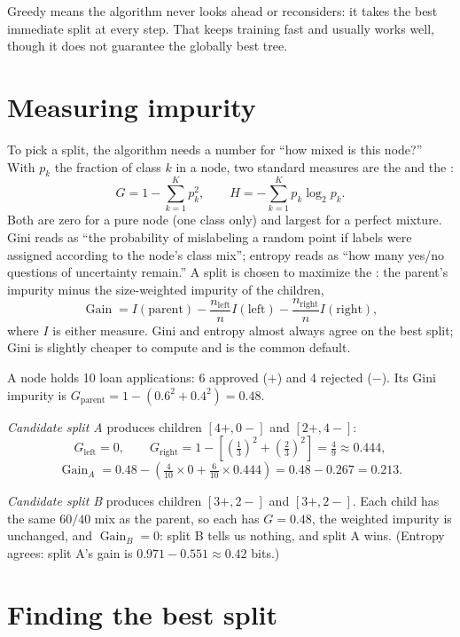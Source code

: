 Greedy means the algorithm never looks ahead or reconsiders: it takes the best immediate split at every step. That keeps training fast and usually works well, though it does not guarantee the globally best tree.

\section{Measuring impurity}

To pick a split, the algorithm needs a number for ``how mixed is this node?'' With $p_k$ the fraction of class $k$ in a node, two standard measures are the  and the :
\[
  G=1-\sum_{k=1}^{K}p_k^2,
  \qquad
  H=-\sum_{k=1}^{K}p_k\log_2 p_k.
\]
Both are zero for a pure node (one class only) and largest for a perfect mixture. Gini reads as ``the probability of mislabeling a random point if labels were assigned according to the node's class mix''; entropy reads as ``how many yes/no questions of uncertainty remain.'' A split is chosen to maximize the : the parent's impurity minus the size-weighted impurity of the children,
\[
  \operatorname{Gain}
  =I(\text{parent})
  -\frac{n_{\mathrm{left}}}{n}I(\text{left})
  -\frac{n_{\mathrm{right}}}{n}I(\text{right}),
\]
where $I$ is either measure. Gini and entropy almost always agree on the best split; Gini is slightly cheaper to compute and is the common default.

\begin{workedexample}
A node holds 10 loan applications: 6 approved ($+$) and 4 rejected ($-$). Its Gini impurity is
$G_{\text{parent}}=1-(0.6^2+0.4^2)=0.48$.

\emph{Candidate split A} produces children $[4+,0-]$ and $[2+,4-]$:
\[
  G_{\text{left}}=0,
  \qquad
  G_{\text{right}}=1-\left[{\left(\tfrac{1}{3}\right)}^2+{\left(\tfrac{2}{3}\right)}^2\right]=\tfrac{4}{9}\approx 0.444,
\]
\[
  \operatorname{Gain}_A
  =0.48-\left(\tfrac{4}{10}\times 0+\tfrac{6}{10}\times 0.444\right)
  =0.48-0.267=0.213.
\]

\emph{Candidate split B} produces children $[3+,2-]$ and $[3+,2-]$. Each child has the same $60/40$ mix as the parent, so each has $G=0.48$, the weighted impurity is unchanged, and $\operatorname{Gain}_B=0$: split B tells us nothing, and split A wins. (Entropy agrees: split A's gain is $0.971-0.551\approx 0.42$ bits.)
\end{workedexample}

\section{Finding the best split}

